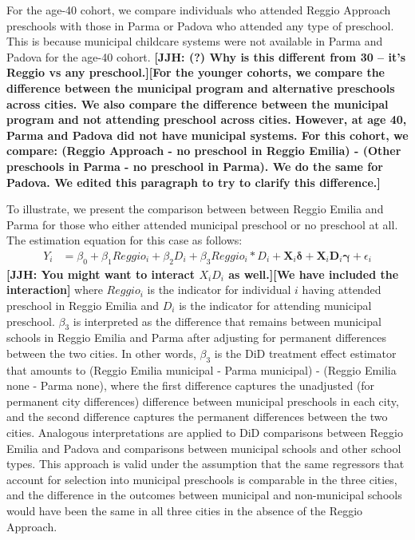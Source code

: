 For the age-40 cohort, we compare individuals who attended Reggio Approach preschools with those in Parma or Padova who attended any type of preschool. This is because municipal childcare systems were not available in Parma and Padova for the age-40 cohort. \textbf{[JJH: (?) Why is this different from 30 -- it's Reggio vs any preschool.][For the younger cohorts, we compare the difference between the municipal program and alternative preschools across cities. We also compare the difference between the municipal program and not attending preschool across cities. However, at age 40, Parma and Padova did not have municipal systems. For this cohort, we compare: (Reggio Approach - no preschool in Reggio Emilia) - (Other preschools in Parma - no preschool in Parma). We do the same for Padova. We edited this paragraph to try to clarify this difference.]}

To illustrate, we present the comparison between between Reggio Emilia and Parma for those who either attended municipal preschool or no preschool at all. The estimation equation for this case as follows:
\begin{eqnarray}  \label{eq:specific2}
Y_i & = \beta_0 + \beta_1 Reggio_i + \beta_2 D_i + \beta_3 Reggio_i * D_i + \bm{X}_i \bm{\delta} + \bm{X}_i \bm{D}_i \bm{\gamma} + \epsilon_i
\end{eqnarray}
\noindent \textbf{[JJH: You might want to interact $X_i D_i$ as well.][We have included the interaction]} where $Reggio_i$ is the indicator for individual $i$ having attended preschool in Reggio Emilia and $D_i$ is the indicator for attending municipal preschool. $\beta_3$ is interpreted as the difference that remains between municipal schools in Reggio Emilia and Parma after adjusting for permanent differences between the two cities. In other words, $\beta_3$ is the DiD treatment effect estimator that amounts to (Reggio Emilia municipal - Parma municipal) - (Reggio Emilia none - Parma none), where the first difference captures the unadjusted (for permanent city differences) difference between municipal preschools in each city, and the second difference captures the permanent differences between the two cities. Analogous interpretations are applied to DiD comparisons between Reggio Emilia and Padova and comparisons between municipal schools and other school types. This approach is valid under the assumption that the same regressors that account for selection into municipal preschools is comparable in the three cities, and the difference in the outcomes between municipal and non-municipal schools would have been the same in all three cities in the absence of the Reggio Approach.

